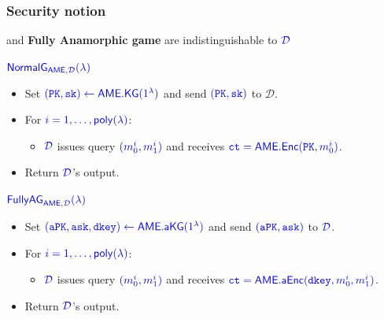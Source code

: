 \documentclass[]{beamer}
\newcommand{\secprm}{\lambda}
\newcommand{\from}{\leftarrow}
\newcommand{\poly}{{\mathsf{poly}}}
\newcommand{\calD}{\mathcal{D}}    %
\newcommand{\algofont}[1]{{\mathsf{#1}}}
\newcommand{\gamefont}[1]{{\mathsf{#1}}}
\newcommand{\objfont}[1]{{\mathtt{#1}}}
\newcommand{\kg}{\algofont{KG}}
\newcommand{\enc}{\algofont{Enc}}
\newcommand{\akg}{\algofont{a}\kg}
\newcommand{\aenc}{\algofont{a}\enc}
\newcommand{\constr}{\algofont{AME}}
\newcommand{\ct}{\objfont{ct}}      %
\newcommand{\pk}{\objfont{PK}}      %
\newcommand{\sk}{\objfont{sk}}      %
\newcommand{\apk}{\objfont{a}\pk}   %
\newcommand{\ask}{\objfont{a}\sk}   %
\newcommand{\dkey}{\objfont{dkey}}  %
\newcommand{\NormalG}{\gamefont{NormalG}}
\newcommand{\FullyAG}{\gamefont{FullyAG}}
\begin{document}
\begin{frame}
\frametitle{Security notion}
{\color{brown}{\bf Normal game} and {\bf Fully Anamorphic game} are indistinguishable 
to $\color{blue}\calD$}
\begin{center}
\begin{boxedminipage}[t]{11cm}
$\color{blue}\NormalG_{\constr,\calD}(\secprm)$
\begin{itemize}
\color{brown}
\item Set $\color{blue}(\pk,\sk)\from\constr.\kg(1^\secprm)$ and send $\color{blue}(\pk,\sk)$ to $\calD$.
\item For $\color{blue}i=1,\ldots,\poly(\secprm)$:
\begin{itemize}
\color{brown}
\item $\color{blue}\calD$ issues query $\color{blue}(m^i_0,m^i_1)$ and receives $\color{blue}\ct=\constr.\enc(\pk,m_0^i)$.
\end{itemize}
\item Return $\color{blue}\calD$'s output.
\end{itemize}
\end{boxedminipage}
{\qquad}\smallskip\noindent
\begin{boxedminipage}[t]{11cm}
$\color{blue}\FullyAG_{\constr,\calD}(\secprm)$
\begin{itemize}
\color{brown}
\item Set $\color{blue}(\apk,\ask,\dkey)\from\constr.\akg(1^\secprm)$ and send $\color{blue}(\apk,\ask)$ to $\color{blue}\calD$.
\item For $\color{blue}i=1,\ldots,\poly(\secprm)$:
\begin{itemize}
\color{brown}
\item $\color{blue}\calD$ issues query $\color{blue}(m^i_0,m^i_1)$ and receives $\color{blue}\ct=\constr.\aenc(\dkey,m_0^i,m_1^i)$.
\end{itemize}
\item Return $\color{blue}\calD$'s output.
\end{itemize}
\end{boxedminipage}
\end{center}

\end{frame}
\end{document}
